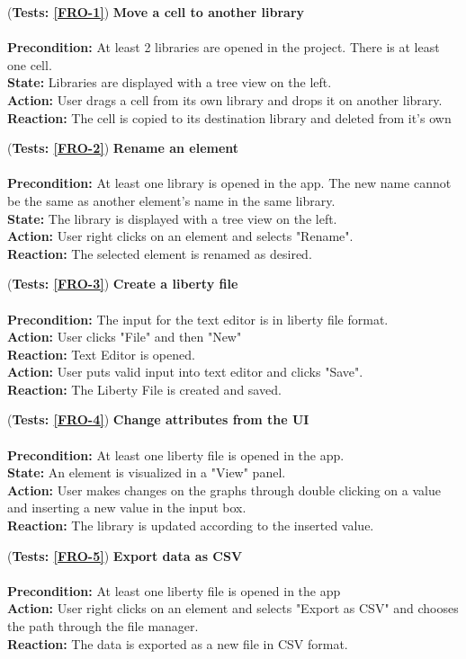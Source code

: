 \documentclass[10pt,a4paper]{report}
\newcommand{\precondition}[1]{
    \textbf{Precondition: } #1 \leavevmode \\
}
\newcommand{\action}[1]{
    \textbf{Action: } #1 \leavevmode \\
}
\newcommand{\state}[1]{
    \textbf{State: } #1 \leavevmode \\
}
\newcommand{\reaction}[1]{
    \textbf{Reaction: } #1 \leavevmode \\
}
\newcommand{\GTCODescription}[2]{
    (\textbf{Tests: #1}) \textbf{#2} \leavevmode \\
}
\begin{document}
\begin{GTCO}
    \item \GTCODescription{\ref{FRO-1}}
    {Move a cell to another library} \leavevmode \\ 
        \precondition{At least 2 libraries are opened in the project. There is at least one cell.}
        \state{Libraries are displayed with a tree view on the left.}
        \action{User drags a cell from its own library and drops it on another library.}
        \reaction{The cell is copied to its destination library and deleted from it's own} \label{GTCO-1}
    
    \item \GTCODescription{\ref{FRO-2}}
    {Rename an element} \leavevmode \\ 
        \precondition{At least one library is opened in the app. The new name cannot be the same as another element's name in the same library.}
        \state{The library is displayed with a tree view on the left.}
        \action{User right clicks on an element and selects "Rename".}
        \reaction{The selected element is renamed as desired.}\label{GTCO-2}
    
    \item \GTCODescription{\ref{FRO-3}}
    {Create a liberty file} \leavevmode \\ 
        \precondition{The input for the text editor is in liberty file format.}
        \action{User clicks "File" and then "New"}
        \reaction{Text Editor is opened.}
        \action{User puts valid input into text editor and clicks "Save".}
        \reaction{The Liberty File is created and saved.}\label{GTCO-3}
    
    \item \GTCODescription{\ref{FRO-4}}
    {Change attributes from the UI} \leavevmode \\ 
        \precondition{At least one liberty file is opened in the app.}
        \state{An element is visualized in a "View" panel.}
        \action{User makes changes on the graphs through double clicking on a value and inserting a new value in the input box.}
        \reaction{The library is updated according to the inserted value.}\label{GTCO-4}
    
    \item \GTCODescription{\ref{FRO-5}}
    {Export data as CSV} \leavevmode \\ 
        \precondition{At least one liberty file is opened in the app}
        \action{User right clicks on an element and selects "Export as CSV" and chooses the path through the file manager.}
        \reaction{The data is exported as a new file in CSV format.}\label{GTCO-5}
    

\end{GTCO}
\end{document}
